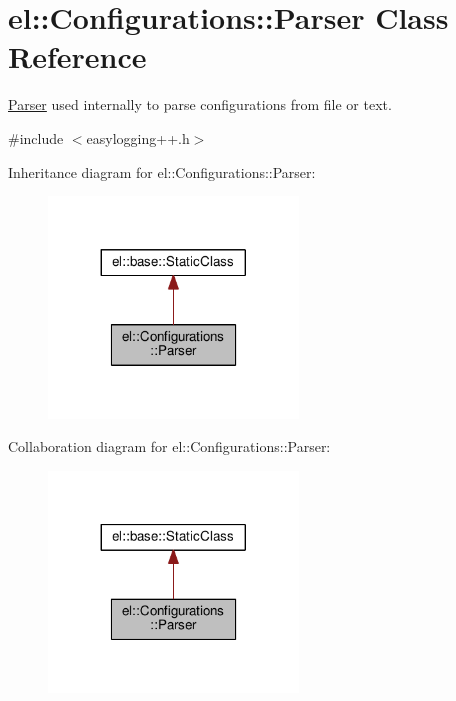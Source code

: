 \hypertarget{classel_1_1_configurations_1_1_parser}{}\section{el\+:\+:Configurations\+:\+:Parser Class Reference}
\label{classel_1_1_configurations_1_1_parser}


\hyperlink{classel_1_1_configurations_1_1_parser}{Parser} used internally to parse configurations from file or text.  




{\ttfamily \#include $<$easylogging++.\+h$>$}



Inheritance diagram for el\+:\+:Configurations\+:\+:Parser\+:
\nopagebreak
\begin{figure}[H]
\begin{center}
\leavevmode
\includegraphics[width=188pt]{classel_1_1_configurations_1_1_parser__inherit__graph}
\end{center}
\end{figure}


Collaboration diagram for el\+:\+:Configurations\+:\+:Parser\+:
\nopagebreak
\begin{figure}[H]
\begin{center}
\leavevmode
\includegraphics[width=188pt]{classel_1_1_configurations_1_1_parser__coll__graph}
\end{center}
\end{figure}
